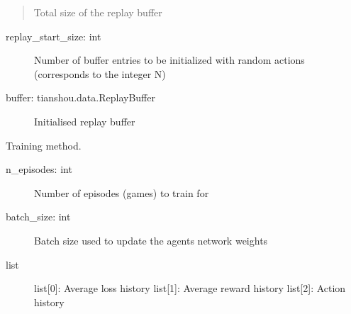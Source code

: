 \documentclass[letterpaper,10pt,english]{sphinxmanual}
\begin{document}
\begin{fulllineitems}
\begin{fulllineitems}
\begin{quote}
\sphinxAtStartPar
Total size of the replay buffer
\end{quote}
\begin{description}
\item[{replay\_start\_size: int}] \leavevmode
\sphinxAtStartPar
Number of buffer entries to be initialized with random actions (corresponds to the integer N)

\end{description}
\begin{description}
\item[{buffer: tianshou.data.ReplayBuffer}] \leavevmode
\sphinxAtStartPar
Initialised replay buffer

\end{description}

\end{fulllineitems}


\begin{fulllineitems}
\label{\detokenize{MultiAgentMarketRL:trainer.DeepQTrainer.train}}
\sphinxAtStartPar
Training method.
\begin{description}
\item[{n\_episodes: int}] \leavevmode
\sphinxAtStartPar
Number of episodes (games) to train for

\item[{batch\_size: int}] \leavevmode
\sphinxAtStartPar
Batch size used to update the agents network weights

\end{description}
\begin{description}
\item[{list}] \leavevmode
\sphinxAtStartPar
list{[}0{]}: Average loss history
list{[}1{]}: Average reward history
list{[}2{]}: Action history

\end{description}

\end{fulllineitems}


\end{fulllineitems}
\end{document}
